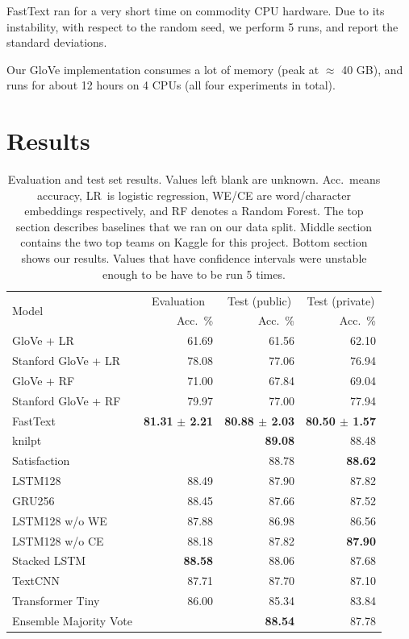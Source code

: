 \documentclass[10pt,conference,compsocconf]{IEEEtran}
\begin{document}
FastText ran for a very short time on commodity CPU hardware.
Due to its instability, with respect to the random seed,
we perform 5 runs, and report the standard deviations. 

Our GloVe implementation consumes a lot of memory (peak at $\approx$ 40 GB), and runs for about 12 hours on 4 CPUs (all four experiments in total).

\section{Results}

\begin{table}\centering
\begin{tabular}{lrrr}
\toprule
\multirow{2}{*}{Model} & \multicolumn{1}{c}{Evaluation} & \multicolumn{1}{c}{Test (public)} & \multicolumn{1}{c}{Test (private)}\\
& Acc.~\% & Acc.~\% & Acc.~\%\\
\midrule
GloVe + LR & 61.69 & 61.56 & 62.10\\
Stanford GloVe + LR & 78.08 & 77.06 & 76.94\\
GloVe + RF & 71.00 & 67.84 & 69.04\\
Stanford GloVe + RF & 79.97 & 77.00 & 77.94\\
FastText \cite{joulin2017bag} & \textbf{81.31} \textbf{$\pm$ 2.21} & \textbf{80.88 $\pm$ 2.03}& \textbf{80.50 $\pm$ 1.57}\\
\midrule
knilpt &  & \textbf{89.08} & 88.48\\
Satisfaction &  & 88.78 & \textbf{88.62}\\
\midrule
LSTM128 & 88.49 & 87.90 & 87.82\\
GRU256 & 88.45 & 87.66 & 87.52\\
LSTM128 w/o WE & 87.88 & 86.98 & 86.56\\
LSTM128 w/o CE & 88.18 & 87.82 & \textbf{87.90}\\
Stacked LSTM & \textbf{88.58} & 88.06 & 87.68\\
TextCNN & 87.71 & 87.70 & 87.10\\
Transformer Tiny & 86.00 & 85.34 & 83.84\\
Ensemble Majority Vote & & \textbf{88.54} & 87.78\\
\bottomrule
\end{tabular}
\caption{Evaluation and test set results. Values left blank are unknown. Acc.~means accuracy, LR~is logistic regression, WE/CE are word/character embeddings respectively, and RF denotes a Random Forest. The top section describes baselines that we ran on our data split. Middle section contains the two top teams on Kaggle for this project. Bottom section shows our results. Values that have confidence intervals were unstable enough to be have to be run 5 times.}\label{tab:results}
\end{table}
\end{document}
